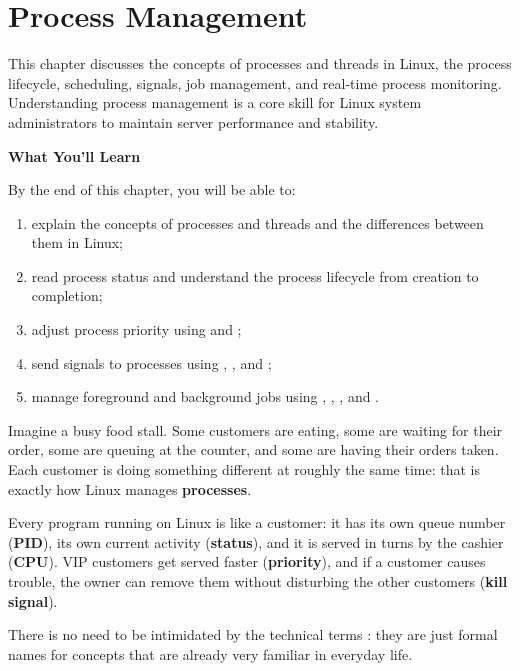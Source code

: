 
\chapter{Process Management}
\label{ch:process-management}


This chapter discusses the concepts of processes and threads in Linux, the
process lifecycle, scheduling, signals, job management, and real-time process
monitoring. Understanding process management is a core skill for Linux system
administrators to maintain server performance and stability.

\textbf{What You'll Learn}

By the end of this chapter, you will be able to:

\begin{enumerate}
    \item explain the concepts of processes and threads and the differences between them in Linux;
    \item read process status and understand the process lifecycle from creation to completion;
    \item adjust process priority using  and ;
    \item send signals to processes using , , and ;
    \item manage foreground and background jobs using , , , and .
\end{enumerate}

\begin{examplebox}
Imagine a busy food stall. Some customers are eating, some are waiting for
their order, some are queuing at the counter, and some are having their orders
taken. Each customer is doing something different at roughly the same time:
that is exactly how Linux manages \textbf{processes}.

Every program running on Linux is like a customer: it has its own queue number
(\textbf{PID}), its own current activity (\textbf{status}), and it is served
in turns by the cashier (\textbf{CPU}). VIP customers get served faster
(\textbf{priority}), and if a customer causes trouble, the owner can remove
them without disturbing the other customers (\textbf{kill signal}).

There is no need to be intimidated by the technical terms : they are just
formal names for concepts that are already very familiar in everyday life.
\end{examplebox}

